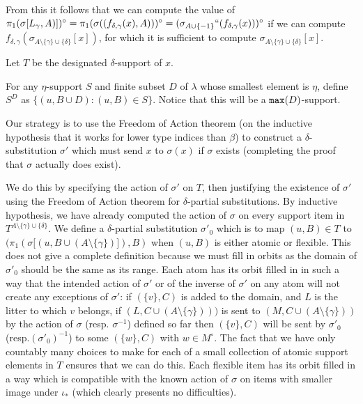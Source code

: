 \documentclass[12pt]{article}
\begin{document}
\begin{enumerate}
From this it follows that we can compute the value of $\pi_1(\sigma[L_\gamma,A)])^\circ = \pi_1( \sigma((f_{\delta,\gamma}(x),A)))^\circ = (\sigma_{A\cup \{-1\}}``(f_{\delta,\gamma}(x)))^\circ$ if we can compute $f_{\delta,\gamma}(\sigma_{A \setminus \{\gamma\}\cup \{\delta\}}[x])$,
for which it is sufficient to compute $\sigma_{A \setminus \{\gamma\}\cup \{\delta\}}[x]$.

Let $T$ be the designated $\delta$-support of $x$.

For any $\eta$-support $S$ and finite subset $D$ of $\lambda$ whose smallest element is $\eta$, define $S^D$ as $\{(u,B \cup D):(u,B) \in S\}$.  Notice that this will be a ${\tt max}(D)$-support.

Our strategy is to use the Freedom of Action theorem (on the inductive hypothesis that it works for lower type indices than $\beta$) to construct a $\delta$-substitution $\sigma'$ which must send $x$ to $\sigma(x)$ if $\sigma$ exists (completing the proof that $\sigma$ actually does exist).

We do this by specifying the action of $\sigma'$ on $T$, then justifying the existence of $\sigma'$ using the Freedom of Action theorem for $\delta$-partial substitutions.  By inductive hypothesis, we have already computed the action of $\sigma$ on every support item in $T^{A\setminus \{\gamma\}\cup \{\delta\}}$.
We define a $\delta$-partial substitution $\sigma'_0$ which is to map $(u,B) \in T$ to $(\pi_1(\sigma[(u,B \cup (A \setminus \{\gamma\})]),B)$ when $(u,B)$ is either atomic or flexible.  This does not give a complete definition because we must fill in orbits as the domain
of $\sigma'_0$ should be the same as its range.  Each atom has its orbit filled in in such a way that the intended action of $\sigma'$ or of the inverse of $\sigma'$ on any atom will not create any exceptions of $\sigma'$:  if $(\{v\},C)$ is added to the domain, and $L$ is the litter to which $v$ belongs,
if $(L,C\cup (A \setminus \{\gamma\})))$ is sent to $(M,C \cup (A \setminus \{\gamma\}))$ by the action of $\sigma$ (resp. $\sigma^{-1}$) defined so far then $(\{v\},C)$ will be sent by $\sigma'_0$ (resp.$ (\sigma'_0)^{-1}$) to some $(\{w\},C)$ with $w \in M^\circ$.  The fact that we have only countably many choices to make
for each of a small collection of atomic support elements in $T$ ensures that we can do this.  Each flexible item has its orbit filled in a way which is compatible with the known action of $\sigma$ on items with smaller image under $\iota_*$ (which clearly presents no difficulties).


\end{enumerate}
\end{document}
